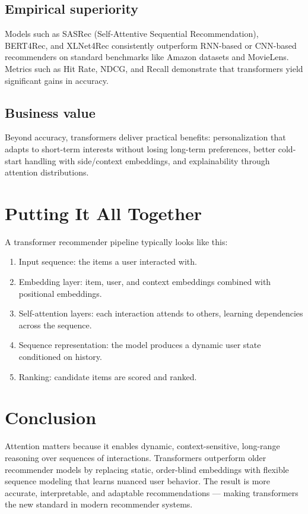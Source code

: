 \documentclass[12pt]{article}
\begin{document}
\subsection{Empirical superiority}
Models such as SASRec (Self-Attentive Sequential Recommendation), BERT4Rec, and XLNet4Rec consistently outperform RNN-based or CNN-based recommenders on standard benchmarks like Amazon datasets and MovieLens. Metrics such as Hit Rate, NDCG, and Recall demonstrate that transformers yield significant gains in accuracy.

\subsection{Business value}
Beyond accuracy, transformers deliver practical benefits: personalization that adapts to short-term interests without losing long-term preferences, better cold-start handling with side/context embeddings, and explainability through attention distributions.

\section{Putting It All Together}

A transformer recommender pipeline typically looks like this:
\begin{enumerate}
    \item Input sequence: the items a user interacted with.
    \item Embedding layer: item, user, and context embeddings combined with positional embeddings.
    \item Self-attention layers: each interaction attends to others, learning dependencies across the sequence.
    \item Sequence representation: the model produces a dynamic user state conditioned on history.
    \item Ranking: candidate items are scored and ranked.
\end{enumerate}

\section{Conclusion}

Attention matters because it enables dynamic, context-sensitive, long-range reasoning over sequences of interactions. Transformers outperform older recommender models by replacing static, order-blind embeddings with flexible sequence modeling that learns nuanced user behavior. The result is more accurate, interpretable, and adaptable recommendations --- making transformers the new standard in modern recommender systems.
\end{document}
